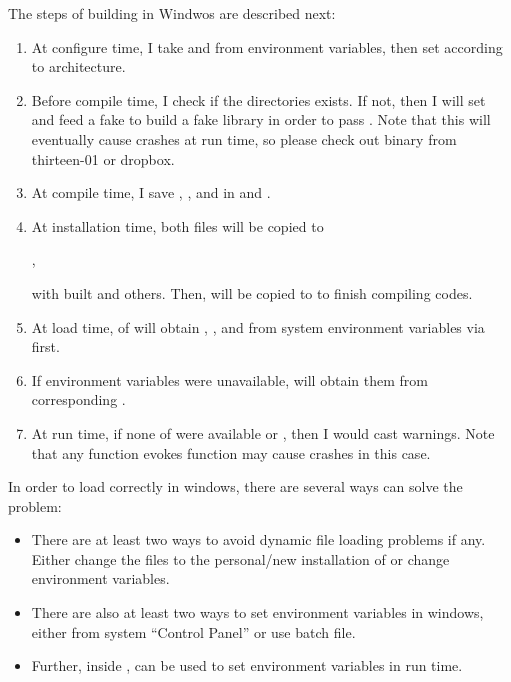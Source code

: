The steps of building  in Windwos are described next:
\begin{enumerate}
\item
At configure time, I take  and 
from environment variables, then set  according to
architecture.
\item
Before compile time, I check if the directories exists. If not, then I will
set  and feed
a fake  to build a fake library in order to pass .
Note that this will eventually cause crashes at run time, so
please check out  binary from thirteen-01 or dropbox.
\item
At compile time, I save
, , and 
in  and .
\item
At installation time, both files will be copied to
\begin{center}
,
\end{center}
with built  and others.
Then,  will be copied to
 to finish compiling  codes.
\item
At load time,  of  will
obtain , , and 
from system environment variables via  first.
\item
If environment variables were unavailable,  will
obtain them from corresponding .
\item
At run time, if none of  were available or
, then I would cast warnings.
Note that any  function evokes  function may
cause crashes in this case.
\end{enumerate}

In order to load  correctly in windows, there are several
ways can solve the problem:
\begin{itemize}
\item
There are at least two ways to avoid dynamic file loading problems
if any. Either change the  files to the personal/new
installation of  or change environment variables.
\item
There are also at least two ways to set environment variables in windows,
either from system ``Control Panel'' or use batch file.
\item
Further, inside ,  can be used to
set environment variables in run time.
\end{itemize}
